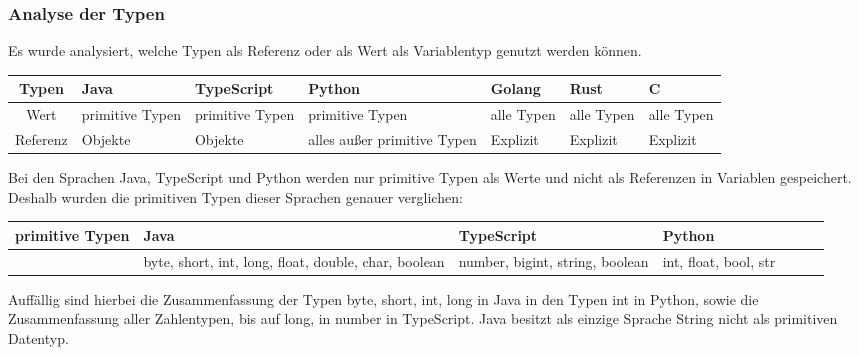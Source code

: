 \documentclass[./einleitung.tex]{subfiles}
\begin{document}
    \subsubsection{Analyse der Typen}
    Es wurde analysiert, welche Typen als Referenz oder als Wert als Variablentyp genutzt werden können.
    \begin{center}
        \begin{tabular}{| c || m{4em} | m{5em} | m{5em} | m{4.5em} | m{4.5em} | m{4.5em} |}
            \hline
            Typen    & Java            & TypeScript                           & Python                      & Golang     & Rust       & C          \\
            \hline
            Wert     & primitive Typen & primitive Typen                      & primitive Typen             & alle Typen & alle Typen & alle Typen \\
            \hline
            Referenz & Objekte         & Objekte & alles außer primitive Typen & Explizit & Explizit & Explizit \\
            \hline
        \end{tabular}
    \end{center}
    Bei den Sprachen Java, TypeScript und Python werden nur primitive Typen als Werte und nicht als Referenzen in Variablen gespeichert.
    Deshalb wurden die primitiven Typen dieser Sprachen genauer verglichen:
    \begin{center}
        \begin{tabular}{| c || m{7em} | m{7em} | m{7em} | m{4.5em} | m{4.5em} | m{4.5em} |}
            \hline
            primitive Typen & Java & TypeScript & Python \\
            \hline
            & byte, short, int, long, float, double, char, boolean
            & number, bigint, string, boolean
            & int, float, bool, str \\
            \hline
        \end{tabular}
    \end{center}
    Auffällig sind hierbei die Zusammenfassung der Typen byte, short, int, long in Java in den Typen int in Python, sowie die Zusammenfassung aller Zahlentypen, bis auf long, in number in TypeScript.
    Java besitzt als einzige Sprache String nicht als primitiven Datentyp.
\end{document}
